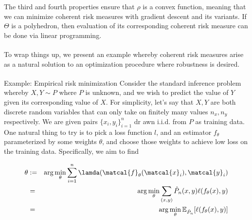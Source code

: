 \documentclass[twoside]{article}
\begin{document}
The third and fourth properties ensure that $\rho$ is a convex function, meaning that we can minimize coherent risk measures with gradient descent and its variants. If $\Theta$ is a polyhedron, then evaluation of its corresponding coherent risk measure can be done via linear programming.
\\
\\
To wrap things up, we present an example whereby coherent risk measures arise as a natural solution to
an optimization procedure where robustness is desired.
\\
\\
Example: Empirical risk minimization
Consider the standard inference problem whereby $X, Y \sim P$ where $P$ is unknown, and we wish to predict the value of $Y$ given its corresponding value of $X$. For simplicity, let’s say that $X, Y$ are both discrete random variables that can only take on finitely many values $n_x, n_y$ respectively. We are given pairs $\{x_i, y_i\}_{i= 1}^n$ dr
awn i.i.d. from $P$ as training data. One natural thing to try is to pick a loss function $l$, and an estimator $f_\theta$ parameterized by some weights $\theta$, and choose those weights to achieve low loss on the training data. Specifically, we aim to find

\begin{eqnarray*}
    \theta &:=& \arg \min_\theta\sum^n_{i=1}\lamda(\matcal{f}_\theta(\matcal{x}_i),\matcal{y}_i) \\
    &=& \arg \min_\theta \sum_{(x,y)} \hat{P}_n(x,y) \ell (f_\theta(x), y) \\ 
    &=& \arg \min_\theta \mathbb{E}_{\hat{P}_n}[\ell (f_\theta(x), y)]  \\ 
\end{eqnarray*}
\end{document}
